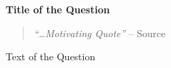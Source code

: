 \documentclass[12pt]{exam}
\begin{document}
\begin{center}
\cellwidth{1.25em}
\addpoints %
\gradetable[h] %
\end{center}

%

\newpage
\begin{questions}
\question \textbf{Title of the Question}

\begin{quote}
\centering \emph{``\ldots Motivating Quote''} \hfill{-- Source}
\end{quote}

Text of the Question
\newpage





\end{questions}
\end{document}
